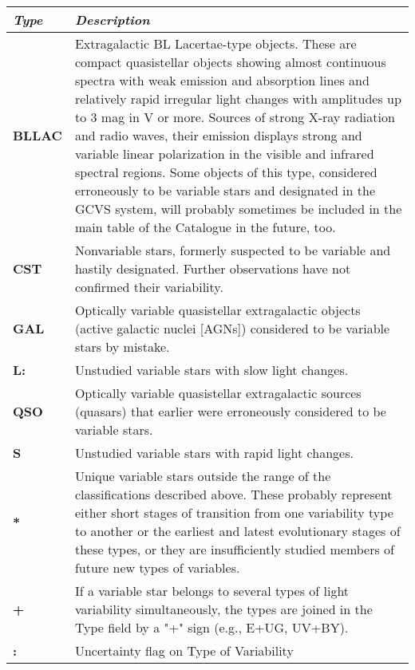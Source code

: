 \begin{longtabu} to \textwidth {l|X}\toprule
\emph{Type}   & \emph{Description}\\\midrule
\textbf{BLLAC} & Extragalactic BL Lacertae-type objects. These are
               compact quasistellar objects showing almost continuous spectra with weak
               emission and absorption lines and relatively rapid irregular light
               changes with amplitudes up to 3 mag in V or more. Sources of strong
               X-ray radiation and radio waves, their emission displays strong and
               variable linear polarization in the visible and infrared spectral
               regions. Some objects of this type, considered erroneously to be
               variable stars and designated in the GCVS system, will probably
               sometimes be included in the main table of the Catalogue in the future, too.\\\midrule
\textbf{CST} & Nonvariable stars, formerly suspected to be variable and
               hastily designated. Further observations have not confirmed their variability.\\\midrule
\textbf{GAL} & Optically variable quasistellar extragalactic objects
               (active galactic nuclei {[}AGNs{]}) considered to be variable stars by mistake.\\\midrule
\textbf{L:}  & Unstudied variable stars with slow light changes.\\\midrule
\textbf{QSO} & Optically variable quasistellar extragalactic sources
               (quasars) that earlier were erroneously considered to be variable stars.\\\midrule
\textbf{S}   & Unstudied variable stars with rapid light changes.\\\midrule
\textbf{*}   & Unique variable stars outside the range of the
               classifications described above. These probably represent either short
               stages of transition from one variability type to another or the
               earliest and latest evolutionary stages of these types, or they are
               insufficiently studied members of future new types of variables.\\\midrule
\textbf{+}   & If a variable star belongs to several types of light
               variability simultaneously, the types are joined in the Type field by a
               "+" sign (e.g., E+UG, UV+BY).\\\midrule
\textbf{:} & Uncertainty flag on Type of Variability\\\bottomrule
\end{longtabu}

